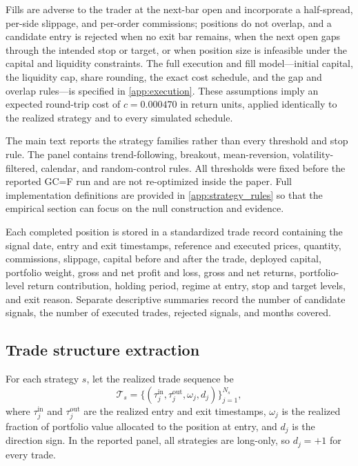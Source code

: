 \documentclass[preprint,12pt]{elsarticle}
\theoremstyle{definition}
\begin{document}
Fills are adverse to the trader at the next-bar open and incorporate a half-spread, per-side slippage, and per-order commissions; positions do not overlap, and a candidate entry is rejected when no exit bar remains, when the next open gaps through the intended stop or target, or when position size is infeasible under the capital and liquidity constraints. The full execution and fill model---initial capital, the liquidity cap, share rounding, the exact cost schedule, and the gap and overlap rules---is specified in \ref{app:execution}. These assumptions imply an expected round-trip cost of $c=0.000470$ in return units, applied identically to the realized strategy and to every simulated schedule.

The main text reports the strategy families rather than every threshold and stop rule. The panel contains trend-following, breakout, mean-reversion, volatility-filtered, calendar, and random-control rules. All thresholds were fixed before the reported GC=F run and are not re-optimized inside the paper. Full implementation definitions are provided in \ref{app:strategy_rules} so that the empirical section can focus on the null construction and evidence.

Each completed position is stored in a standardized trade record containing the signal date, entry and exit timestamps, reference and executed prices, quantity, commissions, slippage, capital before and after the trade, deployed capital, portfolio weight, gross and net profit and loss, gross and net returns, portfolio-level return contribution, holding period, regime at entry, stop and target levels, and exit reason. Separate descriptive summaries record the number of candidate signals, the number of executed trades, rejected signals, and months covered.

\subsection{Trade structure extraction}

For each strategy \(s\), let the realized trade sequence be
\begin{equation}
\mathcal{T}_s=\{(\tau^{\mathrm{in}}_j,\tau^{\mathrm{out}}_j,\omega_j,d_j)\}_{j=1}^{N_s},
\end{equation}
where \(\tau^{\mathrm{in}}_j\) and \(\tau^{\mathrm{out}}_j\) are the realized entry and exit timestamps, \(\omega_j\) is the realized fraction of portfolio value allocated to the position at entry, and \(d_j\) is the direction sign. In the reported panel, all strategies are long-only, so \(d_j=+1\) for every trade.
\end{document}
